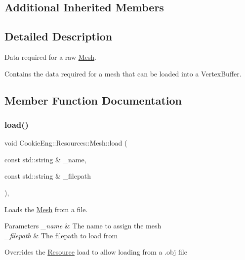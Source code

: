\subsection*{Additional Inherited Members}


\subsection{Detailed Description}
Data required for a raw \hyperlink{struct_cookie_eng_1_1_resources_1_1_mesh}{Mesh}. 

Contains the data required for a mesh that can be loaded into a Vertex\+Buffer. 

\subsection{Member Function Documentation}
\mbox{\label{struct_cookie_eng_1_1_resources_1_1_mesh_ae31053c6edaf0e735d85350bfa6093fb}} 
\subsubsection{\texorpdfstring{load()}{load()}}
{\footnotesize\ttfamily void Cookie\+Eng\+::\+Resources\+::\+Mesh\+::load (\begin{DoxyParamCaption}\item[{const std\+::string \&}]{\+\_\+name,  }\item[{const std\+::string \&}]{\+\_\+filepath }\end{DoxyParamCaption})\hspace{0.3cm}{\ttfamily [override]}, {\ttfamily [virtual]}}



Loads the \hyperlink{struct_cookie_eng_1_1_resources_1_1_mesh}{Mesh} from a file. 


\begin{DoxyParams}{Parameters}
{\em \+\_\+name} & The name to assign the mesh \\
\hline
{\em \+\_\+filepath} & The filepath to load from\\
\hline
\end{DoxyParams}
Overrides the \hyperlink{class_cookie_eng_1_1_resources_1_1_resource}{Resource} load to allow loading from a .obj file 

